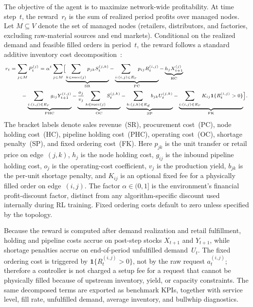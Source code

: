 \documentclass[10pt,a4paper]{article}
\begin{document}
The objective of the agent is to maximize network-wide profitability.
At time step~$t$, the reward~$r_t$ is the sum of realized period
profits over managed nodes. Let $M \subseteq V$ denote the set of
managed nodes (retailers, distributors, and factories, excluding
raw-material sources and end markets). Conditional on the realized
demand and feasible filled orders in period~$t$, the reward follows a
standard additive inventory cost decomposition~\citep{porteus2002}:
\begin{equation}\label{eq:reward}
\scriptsize
\begin{aligned}
r_t
&=\sum_{j\in M}P_t^{(j)}
=\alpha^t\sum_{j\in M}\Bigl[
\underbrace{\sum_{k\in\operatorname{succ}(j)}p_{jk}S_t^{(j,k)}}_{\mathrm{SR}}
-\underbrace{\sum_{i:(i,j)\in E_r}p_{ij}R_t^{(i,j)}}_{\mathrm{PC}}
-\underbrace{h_jX_{t+1}^{(j)}}_{\mathrm{HC}} \\
&\qquad
-\underbrace{\sum_{i:(i,j)\in E_r}g_{ij}Y_{t+1}^{(i,j)}}_{\mathrm{PHC}}
-\underbrace{\frac{o_j}{v_j}\sum_{k\in\operatorname{succ}(j)}S_t^{(j,k)}}_{\mathrm{OC}}
-\underbrace{\sum_{k:(j,k)\in E_d}b_{jk}U_t^{(j,k)}}_{\mathrm{SP}}
-\underbrace{\sum_{i:(i,j)\in E_r}K_{ij}\mathbf{1}\{R_t^{(i,j)}>0\}}_{\mathrm{FK}}
\Bigr].
\end{aligned}
\end{equation}
The bracket labels denote sales revenue~(SR), procurement cost~(PC),
node holding cost~(HC), pipeline holding cost~(PHC), operating cost~(OC),
shortage penalty~(SP), and fixed ordering cost~(FK). Here $p_{jk}$ is the
unit transfer or retail price on edge~$(j,k)$, $h_j$ is the node holding cost, $g_{ij}$ is
the inbound pipeline holding cost, $o_j$ is the operating-cost coefficient,
$v_j$ is the production yield, $b_{jk}$ is the per-unit shortage penalty,
and $K_{ij}$ is an optional fixed fee for a physically filled order on
edge~$(i,j)$. The factor $\alpha \in (0,1]$ is the environment's financial
profit-discount factor, distinct from any algorithm-specific discount used
internally during RL training. Fixed ordering costs default to zero unless
specified by the topology.

Because the reward is computed after demand realization and retail
fulfillment, holding and pipeline costs accrue on post-step stocks
$X_{t+1}$ and $Y_{t+1}$, while shortage penalties accrue on
end-of-period unfulfilled demand~$U_t$. The fixed ordering cost is
triggered by $\mathbf{1}\{R_t^{(i,j)} > 0\}$, not by the raw request
$a_t^{(i,j)}$; therefore a controller is not charged a setup fee for
a request that cannot be physically filled because of upstream inventory,
yield, or capacity constraints. The same decomposed terms are exported as
benchmark KPIs, together with service level, fill rate, unfulfilled
demand, average inventory, and bullwhip diagnostics.
\end{document}
